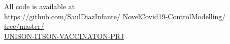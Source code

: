         All code is available at
    \\
    \noindent
    \href{https://github.com/SaulDiazInfante/%
        NovelCovid19-ControlModelling/%
        tree/master/%
        UNISON-ITSON-VACCINATON-PRJ}{%
        https://github.com/SaulDiazInfante/
        NovelCovid19-ControlModelling/
        tree/master/%
        \\
        UNISON-ITSON-VACCINATON-PRJ}
